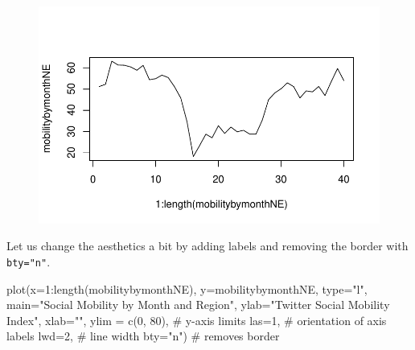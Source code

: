 \documentclass[
  letterpaper,
  DIV=11,
  numbers=noendperiod]{scrreprt}
\newenvironment{Shaded}{\begin{snugshade}}{\end{snugshade}}
\newcommand{\AttributeTok}[1]{\textcolor[rgb]{0.40,0.45,0.13}{#1}}
\newcommand{\CommentTok}[1]{\textcolor[rgb]{0.37,0.37,0.37}{#1}}
\newcommand{\DecValTok}[1]{\textcolor[rgb]{0.68,0.00,0.00}{#1}}
\newcommand{\FunctionTok}[1]{\textcolor[rgb]{0.28,0.35,0.67}{#1}}
\newcommand{\NormalTok}[1]{\textcolor[rgb]{0.00,0.23,0.31}{#1}}
\newcommand{\SpecialCharTok}[1]{\textcolor[rgb]{0.37,0.37,0.37}{#1}}
\newcommand{\StringTok}[1]{\textcolor[rgb]{0.13,0.47,0.30}{#1}}
\begin{document}
\begin{figure}[H]

{\centering \includegraphics{04-Visualization_files/figure-pdf/unnamed-chunk-38-1.pdf}

}

\end{figure}

Let us change the aesthetics a bit by adding labels and removing the
border with \texttt{bty="n"}.

\begin{Shaded}
\begin{Highlighting}[]
\FunctionTok{plot}\NormalTok{(}\AttributeTok{x=}\DecValTok{1}\SpecialCharTok{:}\FunctionTok{length}\NormalTok{(mobilitybymonthNE),}
     \AttributeTok{y=}\NormalTok{mobilitybymonthNE,}
     \AttributeTok{type=}\StringTok{"l"}\NormalTok{, }
     \AttributeTok{main=}\StringTok{"Social Mobility by Month and Region"}\NormalTok{,}
     \AttributeTok{ylab=}\StringTok{"Twitter Social Mobility Index"}\NormalTok{,}
     \AttributeTok{xlab=}\StringTok{""}\NormalTok{,}
     \AttributeTok{ylim =} \FunctionTok{c}\NormalTok{(}\DecValTok{0}\NormalTok{, }\DecValTok{80}\NormalTok{), }\CommentTok{\# y{-}axis limits}
     \AttributeTok{las=}\DecValTok{1}\NormalTok{, }\CommentTok{\# orientation of axis labels}
     \AttributeTok{lwd=}\DecValTok{2}\NormalTok{, }\CommentTok{\# line width}
     \AttributeTok{bty=}\StringTok{"n"}\NormalTok{) }\CommentTok{\# removes border}
\end{Highlighting}
\end{Shaded}
\end{document}
